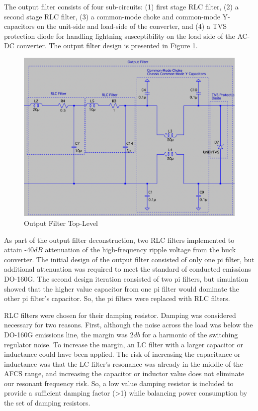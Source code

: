 \documentclass[conference]{IEEEtran}
\begin{document}
The output filter consists of four sub-circuits: (1) first stage RLC filter, (2) a second stage RLC filter, (3) a common-mode choke and common-mode Y-capacitors on the unit-side and load-side of the converter, and (4) a TVS protection diode for handling lightning susceptibility on the load side of the AC-DC converter. The output filter design is presented in Figure \ref{fig:output_filter_top_level_diagram}.

\begin{figure}[htp]
    \centering
    \includegraphics[width=1.0\linewidth]{output_filter_top_level.png}
    \caption{Output Filter Top-Level}
    \label{fig:output_filter_top_level_diagram}
\end{figure}

As part of the output filter deconstruction, two RLC filters implemented to attain -40${dB}$ attenuation of the high-frequency ripple voltage from the buck converter. The initial design of the output filter consisted of only one pi filter, but additional attenuation was required to meet the standard of conducted emissions DO-160G. The second design iteration consisted of two pi filters, but simulation showed that the higher value capacitor from one pi filter would dominate the other pi filter's capacitor. So, the pi filters were replaced with RLC filters.

RLC filters were chosen for their damping resistor. Damping was considered necessary for two reasons. First, although the noise across the load was below the DO-160G emissions line, the margin was 2${db}$ for a harmonic of the switching regulator noise. To increase the margin, an LC filter with a larger capacitor or inductance could have been applied. The risk of increasing the capacitance or inductance was that the LC filter's resonance was already in the middle of the AFCS range, and increasing the capacitor or inductor value does not eliminate our resonant frequency risk. So, a low value damping resistor is included to provide a sufficient damping factor (>1) while balancing power consumption by the set of damping resistors.
\end{document}
